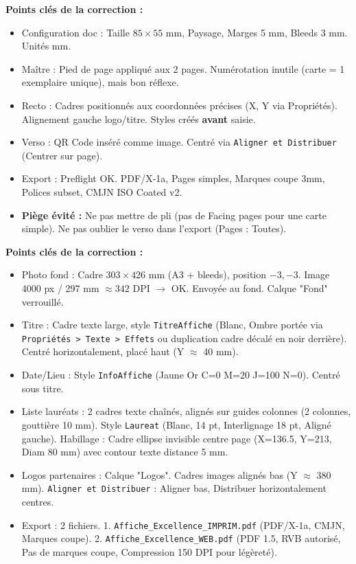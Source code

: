 \documentclass[11pt]{article}
\begin{document}
\begin{corrige}
    \textbf{Points clés de la correction :}
    \begin{itemize}
        \item Configuration doc : Taille $85 \times 55$ mm, Paysage, Marges 5 mm, Bleeds 3 mm. Unités mm.
        \item Maître : Pied de page appliqué aux 2 pages. Numérotation inutile (carte = 1 exemplaire unique), mais bon réflexe.
        \item Recto : Cadres positionnés aux coordonnées précises (X, Y via Propriétés). Alignement gauche logo/titre. Styles créés \textbf{avant} saisie.
        \item Verso : QR Code inséré comme image. Centré via \texttt{Aligner et Distribuer} (Centrer sur page).
        \item Export : Preflight OK. PDF/X-1a, Pages simples, Marques coupe 3mm, Polices subset, CMJN ISO Coated v2.
        \item \textbf{Piège évité :} Ne pas mettre de pli (pas de Facing pages pour une carte simple). Ne pas oublier le verso dans l'export (Pages : Toutes).
    \end{itemize}
\end{corrige}

\begin{corrige}
    \textbf{Points clés de la correction :}
    \begin{itemize}
        \item Photo fond : Cadre $303 \times 426$ mm (A3 + bleeds), position $-3, -3$. Image 4000 px / 297 mm $\approx 342$ DPI $\rightarrow$ OK. Envoyée au fond. Calque "Fond" verrouillé.
        \item Titre : Cadre texte large, style \texttt{TitreAffiche} (Blanc, Ombre portée via \texttt{Propriétés > Texte > Effets} ou duplication cadre décalé en noir derrière). Centré horizontalement, placé haut (Y $\approx$ 40 mm).
        \item Date/Lieu : Style \texttt{InfoAffiche} (Jaune Or C=0 M=20 J=100 N=0). Centré sous titre.
        \item Liste lauréats : 2 cadres texte chaînés, alignés sur guides colonnes (2 colonnes, gouttière 10 mm). Style \texttt{Laureat} (Blanc, 14 pt, Interlignage 18 pt, Aligné gauche). Habillage : Cadre ellipse invisible centre page (X=136.5, Y=213, Diam 80 mm) avec contour texte distance 5 mm.
        \item Logos partenaires : Calque "Logos". Cadres images alignés bas (Y $\approx$ 380 mm). \texttt{Aligner et Distribuer} : Aligner bas, Distribuer horizontalement centres.
        \item Export : 2 fichiers. 1. \texttt{Affiche\_Excellence\_IMPRIM.pdf} (PDF/X-1a, CMJN, Marques coupe). 2. \texttt{Affiche\_Excellence\_WEB.pdf} (PDF 1.5, RVB autorisé, Pas de marques coupe, Compression 150 DPI pour légèreté).
    \end{itemize}
\end{corrige}
\end{document}
